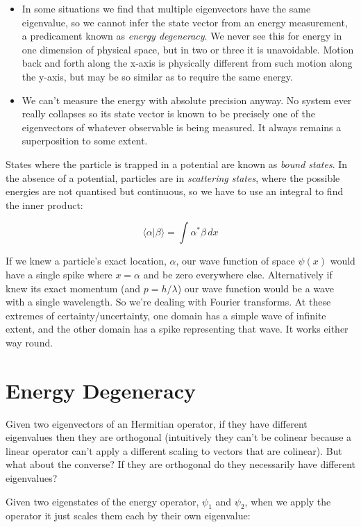 \begin{itemize}
  \item In some situations we find that multiple eigenvectors have the same eigenvalue, so we cannot infer the state vector from an energy measurement, a predicament known as \textit{energy degeneracy}. We never see this for energy in one dimension of physical space, but in two or three it is unavoidable. Motion back and forth along the x-axis is physically different from such motion along the y-axis, but may be so similar as to require the same energy.
  \item We can't measure the energy with absolute precision anyway. No system ever really collapses so its state vector is known to be precisely one of the eigenvectors of whatever observable is being measured. It always remains a superposition to some extent.
\end{itemize}

States where the particle is trapped in a potential are known as \textit{bound states}. In the absence of a potential, particles are in \textit{scattering states}, where the possible energies are not quantised but continuous, so we have to use an integral to find the inner product:

$$
\langle \alpha | \beta \rangle
=
\int
\alpha^* \beta \,dx
$$

If we knew a particle's exact location, $\alpha$, our wave function of space $\psi(x)$ would have a single spike where $x = \alpha$ and be zero everywhere else. Alternatively if knew its exact momentum (and $p=h/\lambda$) our wave function would be a wave with a single wavelength. So we're dealing with Fourier transforms. At these extremes of certainty/uncertainty, one domain has a simple wave of infinite extent, and the other domain has a spike representing that wave. It works either way round.

\section{Energy Degeneracy}

Given two eigenvectors of an Hermitian operator, if they have different eigenvalues then they are orthogonal (intuitively they can't be colinear because a linear operator can't apply a different scaling to vectors that are colinear). But what about the converse? If they are orthogonal do they necessarily have different eigenvalues?

Given two eigenstates of the energy operator, $\psi_1$ and $\psi_2$, when we apply the operator it just scales them each by their own eigenvalue:

